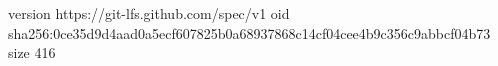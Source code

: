 version https://git-lfs.github.com/spec/v1
oid sha256:0ce35d9d4aad0a5ecf607825b0a68937868c14cf04cee4b9c356c9abbcf04b73
size 416
